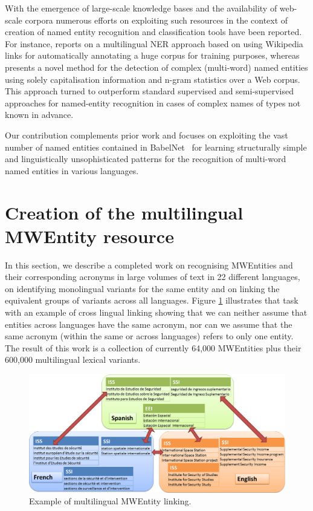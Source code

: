 \documentclass[output=paper]{langsci/langscibook}
\begin{document}
With the emergence of large-scale knowledge bases and the availability
of web-scale corpora numerous efforts on exploiting such resources in
the context of creation of named entity recognition and classification
tools have been reported. For instance,
\citet{nothman:2013:lmn:2405838.2405915} reports on a multilingual NER
approach based on using Wikipedia links for automatically annotating a
huge corpus for training purposes, whereas
\citet{downey:2007:lcn:1625275.1625715} presents a novel method for
the detection of complex (multi-word) named entities using solely
capitalisation information and n-gram statistics over a Web
corpus. This approach turned to outperform standard supervised and
semi-supervised approaches for named-entity recognition in cases of
complex names of types not known in advance.

Our contribution complements prior work and focuses on exploiting the
vast number of named entities contained in BabelNet~\citep{navigli-12}
for learning structurally simple and linguistically unsophisticated
patterns for the recognition of multi-word named entities in various
languages.
 
\section{Creation of the multilingual MWEntity resource}
In this section, we describe a completed work \citep{jacquet-16} on recognising MWEntities and their corresponding acronyms in large volumes of text in 22 different languages, on identifying monolingual variants for the same entity and on linking the equivalent groups of variants across all languages. Figure \ref{acronym linking} illustrates that task with an example of cross lingual linking showing that we can neither assume that entities across languages have the same acronym, nor can we assume that the same acronym (within the same or across languages) refers to only one entity.
The result of this work is a collection of currently 64,000 MWEntities plus their 600,000 multilingual lexical variants.

\begin{figure}
\centering
\includegraphics[scale=0.32]{figures/multiLingAcroLinking.png}
\caption{Example of multilingual MWEntity linking.}
\label{acronym linking}
\end{figure}
\end{document}
